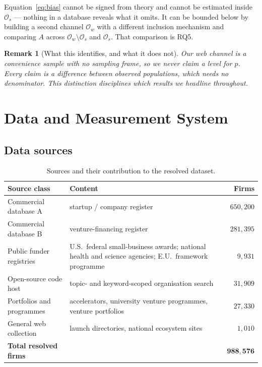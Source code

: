 \documentclass[11pt]{article}
\newtheorem{remark}{Remark}
\begin{document}
Equation~\eqref{eq:bias} cannot be signed from theory and cannot be estimated
inside $\mathcal{O}_s$ --- nothing in a database reveals what it omits. It can
be bounded below by building a second channel $\mathcal{O}_w$ with a different
inclusion mechanism and comparing $A$ across $\mathcal{O}_w \setminus
\mathcal{O}_s$ and $\mathcal{O}_s$. That comparison is RQ5.

\begin{remark}[What this identifies, and what it does not]
Our web channel is a convenience sample with no sampling frame, so we never
claim a level for $p$. Every claim is a \emph{difference} between observed
populations, which needs no denominator. This distinction disciplines which
results we headline throughout.
\end{remark}

\section{Data and Measurement System}
\label{sec:system}

\subsection{Data sources}

\begin{table}[htbp]
\centering\small
\caption{Sources and their contribution to the resolved dataset.}
\label{tab:sources}
\begin{tabular}{@{}p{3.6cm}p{5.1cm}r@{}}
\toprule
\textbf{Source class} & \textbf{Content} & \textbf{Firms} \\
\midrule
Commercial database A & startup / company register & $650{,}200$ \\
Commercial database B & venture-financing register & $281{,}395$ \\
Public funder registries & U.S.\ federal small-business awards; national health and science agencies; E.U.\ framework programme & $9{,}931$ \\
Open-source code host & topic- and keyword-scoped organisation search & $31{,}909$ \\
Portfolios and programmes & accelerators, university venture programmes, venture portfolios & $27{,}330$ \\
General web collection & launch directories, national ecosystem sites & $1{,}010$ \\
\midrule
\textbf{Total resolved firms} & & $\mathbf{988{,}576}$ \\
\bottomrule
\end{tabular}
\end{table}
\end{document}
